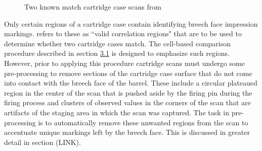 \begin{Schunk}
\begin{figure}[htbp]

{\centering {}

}

\caption{\label{fig:cartridgeCasePair} Two known match cartridge case scans from \citet{fadul_empirical_nodate}}\label{fig:rawBFs}
\end{figure}
\end{Schunk}

Only certain regions of a cartridge case contain identifying breech face
impression markings. \citet{song_proposed_2013} refers to these as
``valid correlation regions" that are to be used to determine whether
two cartridge cases match. The cell-based comparison procedure described
in section \protect\hyperlink{comparisonProcedure}{3.1} is designed to
emphasize such regions. However, prior to applying this procedure
cartridge scans must undergo some pre-processing to remove sections of
the cartridge case surface that do not come into contact with the breech
face of the barrel. These include a circular plateaued region in the
center of the scan that is pushed aside by the firing pin during the
firing process and clusters of observed values in the corners of the
scan that are artifacts of the staging area in which the scan was
captured. The task in pre-processing is to automatically remove these
unwanted regions from the scan to accentuate unique markings left by the
breech face. This is discussed in greater detail in section (LINK).

